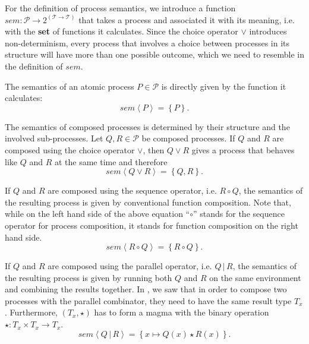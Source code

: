 For the definition of process semantics, we introduce a function $sem \colon \mathcal{P} \to 2^{\left( \mathcal{T} \to \mathcal{T} \right)}$ that takes a process and associated it with its meaning, i.e. with the \textbf{set} of functions it calculates. Since the choice operator $\vee$ introduces non-determinism, every process that involves a choice between processes in its structure will have more than one possible outcome, which we need to resemble in the definition of $sem$.

The semantics of an atomic process $P \in \mathcal{P}$ is directly given by the function it calculates:
\begin{equation}
  \label{eqn:sem_atomic}
  sem \left\langle P \right\rangle = \left\{ P \right\}.
\end{equation}

The semantics of composed processes is determined by their structure and the involved sub-processes. Let $Q, R \in \mathcal{P}$ be composed processes. If $Q$ and $R$ are composed using the choice operator $\vee$, then $Q \vee R$ gives a process that behaves like $Q$ and $R$ at the same time and therefore
\begin{equation}
  \label{eqn:sem_choice}
  sem \left\langle Q \vee R \right\rangle = \left\{ Q, R \right\}.
\end{equation}

If $Q$ and $R$ are composed using the sequence operator, i.e. $R \circ Q$, the semantics of the resulting process is given by conventional function composition. Note that, while on the left hand side of the above equation \enquote{$\circ$} stands for the sequence operator for process composition, it stands for function composition on the right hand side.
\begin{equation}
  \label{eqn:sem_sequence}
  sem \left\langle R \circ Q \right\rangle = \left\{ R \circ Q \right\}.
\end{equation}

If $Q$ and $R$ are composed using the parallel operator, i.e. $Q \,|\, R$, the semantics of the resulting process is given by running both $Q$ and $R$ on the same environment and combining the results together. In , we saw that in order to compose two processes with the parallel combinator, they need to have the same result type $T_x$. Furthermore, $\left( T_x, \star \right)$ has to form a magma with the binary operation $\star \colon T_x \times T_x \to T_x$.
\begin{equation}
  \label{eqn:sem_parallel}
  sem \left\langle Q \,|\, R \right\rangle = \left\{ x \mapsto Q \left( x \right) \star R \left( x \right) \right\}.
\end{equation}

